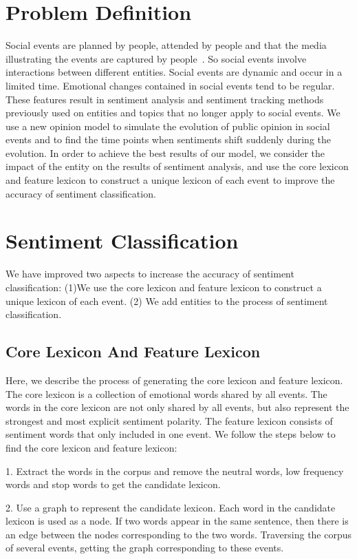 \documentclass[runningheads]{llncs}
\begin{document}
\section{Problem Definition}\label{sec:problem definition}
Social events are planned by people, attended by people and that the media illustrating the events are captured by people~\cite{Papadopoulos2012SocialEvent}. So social events involve interactions between different entities. Social events are dynamic and occur in a limited time. Emotional changes contained in social events tend to be regular. These features result in sentiment analysis and sentiment tracking methods previously used on entities and topics that no longer apply to social events. We use a new opinion model to simulate the evolution of public opinion in social events and to find the time points when sentiments shift suddenly during the evolution. In order to achieve the best results of our model, we consider the impact of the entity on the results of sentiment analysis, and use the core lexicon and feature lexicon to construct a unique lexicon of each event to improve the accuracy of sentiment classification.


\section{Sentiment Classification}\label{sec:sentiment classification}
We have improved two aspects to increase the accuracy of sentiment classification:  (1)We use the core lexicon and feature lexicon to construct a unique lexicon of each event. (2) We add entities to the process of sentiment classification.
\subsection{Core Lexicon And Feature Lexicon}
Here, we describe the process of generating the core lexicon and feature lexicon.
The core lexicon is a collection of emotional words shared by all events. The words in the core lexicon are not only shared by all events, but also represent the strongest and most explicit sentiment polarity. The feature lexicon consists of sentiment words that only included in one event. We follow the steps below to find the core lexicon and feature lexicon: 

1. Extract the words in the corpus and remove the neutral words, low frequency words and stop words to get the candidate lexicon. 

2. Use a graph to represent the candidate lexicon. Each word in the candidate lexicon is used as a node. If two words appear in the same sentence, then there is an edge between the nodes corresponding to the two words. Traversing the corpus of several events, getting the graph corresponding to these events. 
\end{document}

